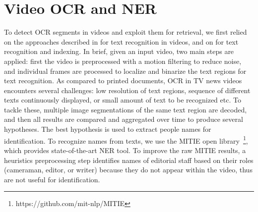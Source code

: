 \section{Video OCR and NER}
\label{sec:ocr_ner}

To detect OCR segments in videos and exploit them for retrieval, we first relied on the approaches described in
\cite{chen-pr04,odobez-prl05} for text recognition in videos, and on \cite{daddaoua:ICDAR:05,vincia:tmm:05}
for text recognition and indexing.
%
In brief, given an input video, two main steps are applied: first the video is preprocessed with a motion filtering to reduce noise, and individual frames are processed to localize and binarize the text regions for text recognition.
%
As compared to printed documents, OCR in TV news videos encounters several challenges: low resolution of text regions, sequence of different texts continuously displayed, or small amount of text to be recognized etc.
%
To tackle these, multiple image segmentations of the same text region are decoded, and then all results are compared and aggregated over time to produce several hypotheses. 
%
The best hypothesis is used to extract people names for identification. To recognize names from texts, we use the MITIE open library~\footnote{https://github.com/mit-nlp/MITIE}, which provides state-of-the-art NER tool. 
%
%
To improve the raw MITIE results, a heuristics preprocessing step identifies names of editorial staff based on their roles (cameraman, editor, or writer) because they do not appear within the video, thus are not useful for identification.

\endinput
